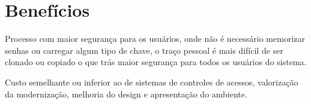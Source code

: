 \documentclass[conference,compsoc]{IEEEtran}
\begin{document}
\section{Benefícios}
Processo com maior segurança para os usuários, onde não é necessário  memorizar senhas ou carregar algum tipo de chave, o traço pessoal é mais difícil de ser clonado ou copiado o que trás maior segurança para todos os usuários do sistema.

Custo semelhante ou inferior ao de sistemas de controles de acessos, valorização da modernização, melhoria do design e apresentação do ambiente.






\end{document}
